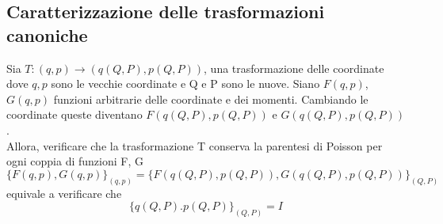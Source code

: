 \documentclass[
10pt, %
a4paper, %
oneside, %
headinclude,footinclude, %
BCOR5mm, %
]{scrartcl}
\begin{document}
\subsection{Caratterizzazione delle trasformazioni canoniche}
\begin{teorema}\label{ap:caratterizzazione}
	Sia \(T:(q, p)\rightarrow(q(Q, P), p(Q, P))\), una trasformazione delle coordinate dove \(q, p\) sono le vecchie coordinate e Q e P sono le nuove. Siano \(F(q, p)\), \(G(q, p)\) funzioni arbitrarie delle coordinate e dei momenti. Cambiando le coordinate queste diventano \(F(q(Q, P), p(Q, P))\) e \(G(q(Q, P), p(Q, P))\).\\
	
	Allora, verificare che la trasformazione T conserva la parentesi di Poisson per ogni coppia di funzioni F, G
	\[\{F(q, p), G(q, p)\}_{(q, p)} = \{F(q(Q, P), p(Q, P)), G(q(Q, P), p(Q, P))\}_{(Q, P)}\]
	equivale a verificare che
	\[\{q(Q, P). p(Q, P)\}_{(Q, P)} = I\]
\end{teorema}
\end{document}
